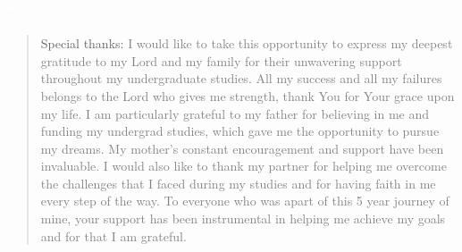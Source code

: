 \chapter*{\textcolor{white}{.}}
\makeatletter{}\makeatother
\label{appen:thanks}
\begin{quote}
    \singlespacing
    {\tiny Special thanks:\newline
    \textcolor{gray}{I would like to take this opportunity to express my deepest gratitude to my Lord and my family for their unwavering support throughout my undergraduate studies. All my success and all my failures belongs to the Lord who gives me strength, thank You for Your grace upon my life. I am particularly grateful to my father for believing in me and funding my undergrad studies, which gave me the opportunity to pursue my dreams. My mother's constant encouragement and support have been invaluable. I would also like to thank my partner for helping me overcome the challenges that I faced during my studies and for having faith in me every step of the way. To everyone who was apart of this 5 year journey of mine, your support has been instrumental in helping me achieve my goals and for that I am grateful.}}
\end{quote}